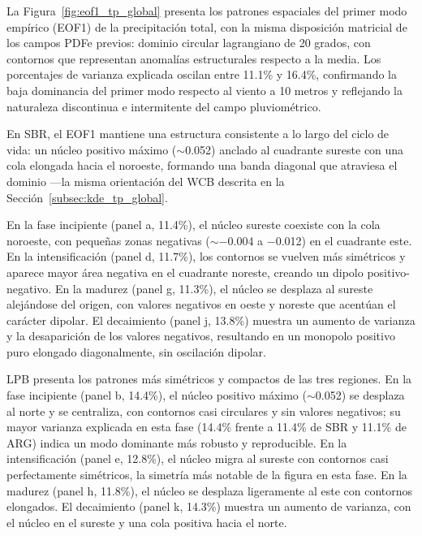 La Figura~\ref{fig:eof1_tp_global} presenta los patrones espaciales del primer modo empírico (EOF1) de la precipitación total, con la misma disposición matricial de los campos PDFe previos: dominio circular lagrangiano de 20 grados, con contornos que representan anomalías estructurales respecto a la media. Los porcentajes de varianza explicada oscilan entre 11.1\% y 16.4\%, confirmando la baja dominancia del primer modo respecto al viento a 10 metros y reflejando la naturaleza discontinua e intermitente del campo pluviométrico.

En SBR, el EOF1 mantiene una estructura consistente a lo largo del ciclo de vida: un núcleo positivo máximo ($\sim$0.052) anclado al cuadrante sureste con una cola elongada hacia el noroeste, formando una banda diagonal que atraviesa el dominio —la misma orientación del WCB descrita en la Sección~\ref{subsec:kde_tp_global}.

En la fase incipiente (panel a, 11.4\%), el núcleo sureste coexiste con la cola noroeste, con pequeñas zonas negativas ($\sim$$-$0.004 a $-$0.012) en el cuadrante este. En la intensificación (panel d, 11.7\%), los contornos se vuelven más simétricos y aparece mayor área negativa en el cuadrante noreste, creando un dipolo positivo-negativo. En la madurez (panel g, 11.3\%), el núcleo se desplaza al sureste alejándose del origen, con valores negativos en oeste y noreste que acentúan el carácter dipolar. El decaimiento (panel j, 13.8\%) muestra un aumento de varianza y la desaparición de los valores negativos, resultando en un monopolo positivo puro elongado diagonalmente, sin oscilación dipolar.

LPB presenta los patrones más simétricos y compactos de las tres regiones. En la fase incipiente (panel b, 14.4\%), el núcleo positivo máximo ($\sim$0.052) se desplaza al norte y se centraliza, con contornos casi circulares y sin valores negativos; su mayor varianza explicada en esta fase (14.4\% frente a 11.4\% de SBR y 11.1\% de ARG) indica un modo dominante más robusto y reproducible. En la intensificación (panel e, 12.8\%), el núcleo migra al sureste con contornos casi perfectamente simétricos, la simetría más notable de la figura en esta fase. En la madurez (panel h, 11.8\%), el núcleo se desplaza ligeramente al este con contornos elongados. El decaimiento (panel k, 14.3\%) muestra un aumento de varianza, con el núcleo en el sureste y una cola positiva hacia el norte.

